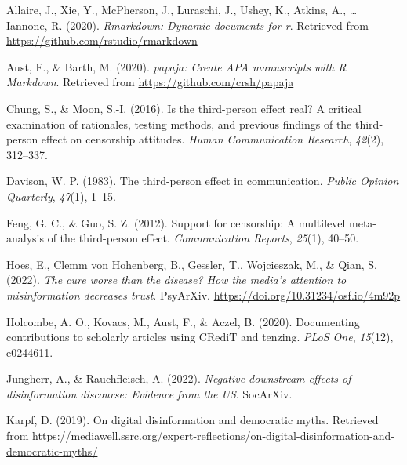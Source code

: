 \documentclass[
  ,jou,floatsintext]{apa6}
\newlength{\cslhangindent}
\newlength{\cslentryspacingunit} %
\newenvironment{CSLReferences}[2] %
 {%
  \setlength{\parindent}{0pt}
  \ifodd #1
  \let\oldpar\par
  \def\par{\hangindent=\cslhangindent\oldpar}
  \fi
  \setlength{\parskip}{#2\cslentryspacingunit}
 }%
 {}
\begin{document}
\hypertarget{refs}{}
\begin{CSLReferences}{1}{0}
\leavevmode{}%
Allaire, J., Xie, Y., McPherson, J., Luraschi, J., Ushey, K., Atkins, A., \ldots{} Iannone, R. (2020). \emph{Rmarkdown: Dynamic documents for r}. Retrieved from \url{https://github.com/rstudio/rmarkdown}

\leavevmode{}%
Aust, F., \& Barth, M. (2020). \emph{{papaja}: {Create} {APA} manuscripts with {R Markdown}}. Retrieved from \url{https://github.com/crsh/papaja}

\leavevmode{}%
Chung, S., \& Moon, S.-I. (2016). Is the third-person effect real? A critical examination of rationales, testing methods, and previous findings of the third-person effect on censorship attitudes. \emph{Human Communication Research}, \emph{42}(2), 312--337.

\leavevmode{}%
Davison, W. P. (1983). The third-person effect in communication. \emph{Public Opinion Quarterly}, \emph{47}(1), 1--15.

\leavevmode{}%
Feng, G. C., \& Guo, S. Z. (2012). Support for censorship: A multilevel meta-analysis of the third-person effect. \emph{Communication Reports}, \emph{25}(1), 40--50.

\leavevmode{}%
Hoes, E., Clemm von Hohenberg, B., Gessler, T., Wojcieszak, M., \& Qian, S. (2022). \emph{The cure worse than the disease? How the media's attention to misinformation decreases trust}. PsyArXiv. \url{https://doi.org/10.31234/osf.io/4m92p}

\leavevmode{}%
Holcombe, A. O., Kovacs, M., Aust, F., \& Aczel, B. (2020). Documenting contributions to scholarly articles using CRediT and tenzing. \emph{PLoS One}, \emph{15}(12), e0244611.

\leavevmode{}%
Jungherr, A., \& Rauchfleisch, A. (2022). \emph{Negative downstream effects of disinformation discourse: Evidence from the US}. SocArXiv.

\leavevmode{}%
Karpf, D. (2019). On digital disinformation and democratic myths. Retrieved from \url{https://mediawell.ssrc.org/expert-reflections/on-digital-disinformation-and-democratic-myths/}


\end{CSLReferences}
\end{document}
